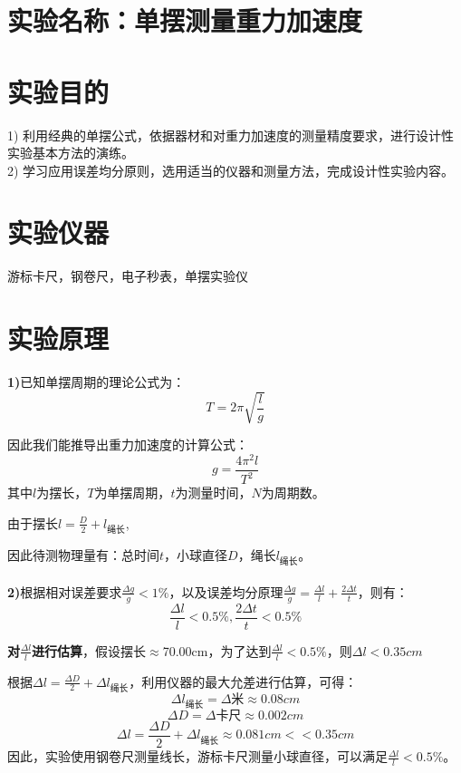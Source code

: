 \documentclass[12pt,a4paper]{article}
\begin{document}

	
	\section{实验名称：单摆测量重力加速度}
	
	\section{实验目的}
	\par
	1) 利用经典的单摆公式，依据器材和对重力加速度的测量精度要求，进行设计性实验基本方法的演练。 
	\\
	2) 学习应用误差均分原则，选用适当的仪器和测量方法，完成设计性实验内容。
	
	\section{实验仪器}
	游标卡尺，钢卷尺，电子秒表，单摆实验仪
	
	\section{实验原理}
	
	\textbf{1)}已知单摆周期的理论公式为：\[ T = 2\pi \sqrt{\frac{l}{g}} \]
	
	因此我们能推导出重力加速度的计算公式：\[ g = \frac{4\pi^2 l}{T^2} \]
	其中\( l \)为摆长，\( T \)为单摆周期，\( t \)为测量时间，\( N \)为周期数。	
	
	由于摆长\( l = \frac{D}{2} + l_{\text{绳长}} \),
	
	因此待测物理量有：总时间\( t \)，小球直径\( D \)，绳长\( l_{\text{绳长}} \)。
	\\
	\\
	\textbf{2)}根据相对误差要求\( \frac{\Delta g}{g} < 1\% \)，以及误差均分原理\( \frac{\Delta g}{g} = \frac{\Delta l}{l} + \frac{2\Delta t}{t} \)，则有：\[ \frac{\Delta l}{l} < 0.5\% , \frac{2\Delta t}{t} < 0.5\%  \]
	
	\textbf{对\( \frac{\Delta l}{l} \)进行估算}，假设摆长\( \approx \)70.00cm，为了达到\(\frac{\Delta l}{l} < 0.5\%  \)，则\( \Delta l < 0.35cm \)
	
	根据\( \Delta l = \frac{\Delta D}{2} + \Delta l_{\text{绳长}} \)，利用仪器的最大允差进行估算，可得：
	\[ \Delta l_{\text{绳长}} = \Delta \text{米} \approx 0.08cm \]
	\[ \Delta D = \Delta \text{卡尺} \approx 0.002cm \]
	\[ \Delta l = \frac{\Delta D}{2} + \Delta l_{\text{绳长}} \approx 0.081cm << 0.35cm \]
	因此，实验使用钢卷尺测量线长，游标卡尺测量小球直径，可以满足\(\frac{\Delta l}{l} < 0.5\%  \)。
	
\end{document}
